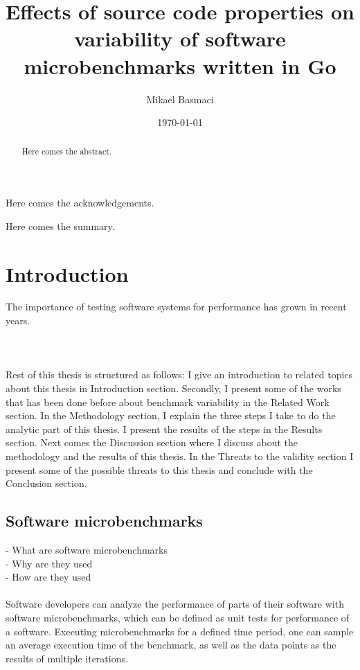 \documentclass{seal_thesis}
\date{\today}
\title{Effects of source code properties on variability of software microbenchmarks written in Go}
\author{Mikael Basmaci}
\begin{document}
\maketitle

\frontmatter

\begin{acknowledgements}
	Here comes the acknowledgements.
\end{acknowledgements}

\begin{abstract}
	Here comes the abstract.
\end{abstract}

\begin{zusammenfassung}
	Here comes the summary.
\end{zusammenfassung}

\tableofcontents
\listoffigures
\listoftables
\lstlistoflistings

\mainmatter

\chapter{Introduction}
The importance of testing software systems for performance has grown in recent years. \\
\\
\\
\\
Rest of this thesis is structured as follows: I give an introduction to related topics about this thesis in Introduction section. Secondly, I present some of the works that has been done before about benchmark variability in the Related Work section. In the Methodology section, I explain the three steps I take to do the analytic part of this thesis. I present the results of the steps in the Results section. Next comes the Discussion section where I discuss about the methodology and the results of this thesis. In the Threats to the validity section I present some of the possible threats to this thesis and conclude with the Conclusion section.
\section{Software microbenchmarks} 
- What are software microbenchmarks \\
- Why are they used \\
- How are they used \\
\\
Software developers can analyze the performance of parts of their software with software
microbenchmarks, which can be defined as unit tests for performance of a software.
Executing microbenchmarks for a defined time period, one can sample an average execution
time of the benchmark, as well as the data points as the results of multiple iterations.
\end{document}
